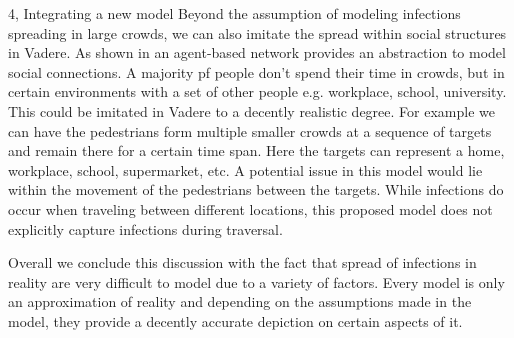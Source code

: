 \begin{task}{4, Integrating a new model}
Beyond the assumption of modeling infections spreading in large crowds, we can also imitate the spread within social structures in Vadere. As shown in \cite{wolfram2020} an agent-based network provides an abstraction to model social connections. A majority pf people don't spend their time in crowds, but in certain environments with a set of other people e.g. workplace, school, university. This could be imitated in Vadere to a decently realistic degree. For example we can have the pedestrians form multiple smaller crowds at a sequence of targets and remain there for a certain time span. Here the targets can represent a home, workplace, school, supermarket, etc. A potential issue in this model would lie within the movement of the pedestrians between the targets. While infections do occur when traveling between different locations, this proposed model does not explicitly capture infections during traversal.

Overall we conclude this discussion with the fact that spread of infections in reality are very difficult to model due to a variety of factors. Every model is only an approximation of reality and depending on the assumptions made in the model, they provide a decently accurate depiction on certain aspects of it.

\end{task}